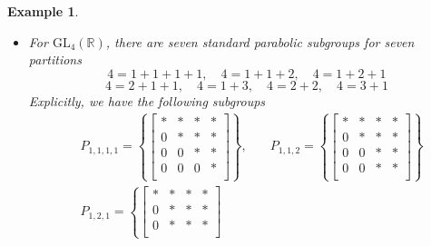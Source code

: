 \documentclass[12pt]{article} %
\newtheorem{example}[definition]{Example}
\begin{document}
\begin{example}
\begin{itemize}
        \item For  $\text{GL}_4(\mathbb{R})$, there are seven standard parabolic subgroups for seven partitions
              \[ 4 = 1+ 1+1+1, \quad 4 =1+1+2, \quad 4 = 1+2+1\]
              \[4 =2+1+1, \quad 4 = 1+3, \quad 4 = 2+2, \quad 4 = 3+1\]
              Explicitly, we have the following subgroups
              \begin{align*}
                   & P_{1,1,1,1} = \left\lbrace \begin{bmatrix}
                                                    \ast & \ast & \ast & \ast \\
                                                    0    & \ast & \ast & \ast \\
                                                    0    & 0    & \ast & \ast \\
                                                    0    & 0    & 0    & \ast \\
                                                \end{bmatrix} \right\rbrace, \quad & P_{1,1,2} = \left\lbrace \begin{bmatrix}
                                                                                                                  \ast & \ast & \ast & \ast \\
                                                                                                                  0    & \ast & \ast & \ast \\
                                                                                                                  0    & 0    & \ast & \ast \\
                                                                                                                  0    & 0    & \ast & \ast \\
                                                                                                              \end{bmatrix} \right\rbrace \\
                   & P_{1,2,1} = \left\lbrace \begin{bmatrix}
                                                  \ast & \ast & \ast & \ast \\
                                                  0    & \ast & \ast & \ast \\
                                                  0    & \ast & \ast & \ast \\

\end{bmatrix}
\end{align*}
\end{itemize}
\end{example}
\end{document}
